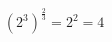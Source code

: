 \documentclass[preview]{standalone}
\begin{document}
\begin{align*}
(2^3)^{\frac{2}{3}} = 2^2 = 4
\end{align*}
\end{document}
